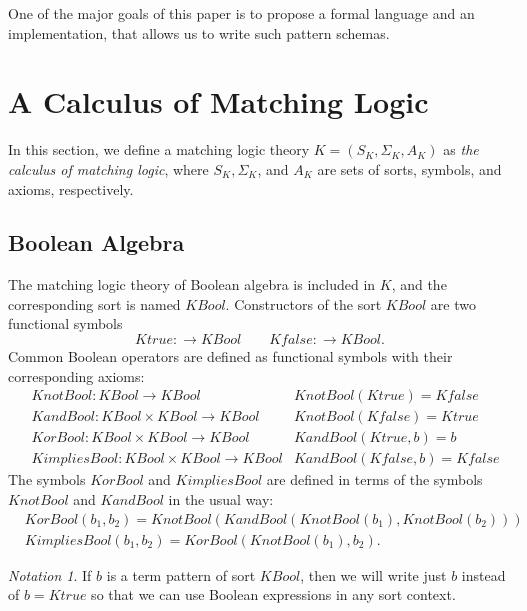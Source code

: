 \documentclass[UTF8]{article}
\newcounter{thmcounter}
\theoremstyle{plain}
\theoremstyle{definition}
\theoremstyle{remark}
\newtheorem{notation}[thmcounter]{Notation}
\newcommand{\KBool}{\mathit{KBool}}
\newcommand{\Ktrue}{\mathit{Ktrue}}
\newcommand{\Kfalse}{\mathit{Kfalse}}
\newcommand{\KandBool}{\mathit{KandBool}}
\newcommand{\KorBool}{\mathit{KorBool}}
\newcommand{\KnotBool}{\mathit{KnotBool}}
\newcommand{\KimpliesBool}{\mathit{KimpliesBool}}
\begin{document}
One of the major goals of this paper is to propose a formal language
and an implementation, that allows us to write such pattern schemas.

\section{A Calculus of Matching Logic}

In this section, we define a matching logic theory $K = (S_K, \Sigma_K, A_K)$ 
as \emph{the calculus of matching logic},
where $S_K, \Sigma_K$, and $A_K$ are sets of sorts, symbols, and axioms, 
respectively.

\subsection{Boolean Algebra}

The matching logic theory of Boolean algebra is included in $K$,
and the corresponding sort is named $\KBool$.
Constructors of the sort $\KBool$ are two functional symbols
\begin{equation*}
\Ktrue \colon \to \KBool \qquad \Kfalse \colon \to \KBool.
\end{equation*}
Common Boolean operators are defined as functional symbols with their
corresponding axioms:
\begin{align*}
&\KnotBool \colon \KBool \to \KBool
&\KnotBool(\Ktrue) = \Kfalse
\\
&\KandBool \colon \KBool \times \KBool \to \KBool
&\KnotBool(\Kfalse) = \Ktrue
\\
&\KorBool \colon \KBool \times \KBool \to \KBool
&\KandBool(\Ktrue, b) = b
\\
&\KimpliesBool \colon \KBool \times \KBool \to \KBool
&\KandBool(\Kfalse, b) = \Kfalse
\end{align*}
The symbols $\KorBool$ and $\KimpliesBool$ are defined in terms of the symbols
$\KnotBool$ and $\KandBool$ in the usual way:
\begin{align*}
&\KorBool(b_1, b_2) = \KnotBool(\KandBool(\KnotBool(b_1), \KnotBool(b_2)))
\\
&\KimpliesBool(b_1, b_2) = \KorBool(\KnotBool(b_1), b_2).
\end{align*}

\begin{notation}
	If $b$ is a term pattern of sort $\KBool$, then we will write just $b$ instead of $b = \Ktrue$ so that we can use Boolean expressions in any sort context.
\end{notation}
\end{document}
